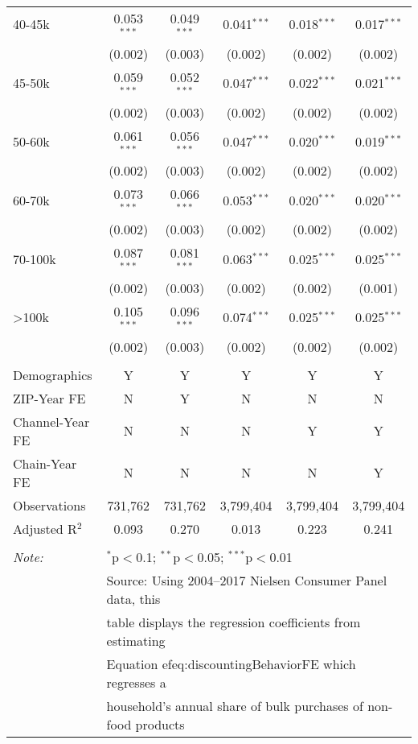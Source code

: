 \begin{table}[!htbp]
\begin{tabular}{@{\extracolsep{5pt}}lccccc}
  40-45k & 0.053$^{***}$ & 0.049$^{***}$ & 0.041$^{***}$ & 0.018$^{***}$ & 0.017$^{***}$ \\ 
  & (0.002) & (0.003) & (0.002) & (0.002) & (0.002) \\ 
  45-50k & 0.059$^{***}$ & 0.052$^{***}$ & 0.047$^{***}$ & 0.022$^{***}$ & 0.021$^{***}$ \\ 
  & (0.002) & (0.003) & (0.002) & (0.002) & (0.002) \\ 
  50-60k & 0.061$^{***}$ & 0.056$^{***}$ & 0.047$^{***}$ & 0.020$^{***}$ & 0.019$^{***}$ \\ 
  & (0.002) & (0.003) & (0.002) & (0.002) & (0.002) \\ 
  60-70k & 0.073$^{***}$ & 0.066$^{***}$ & 0.053$^{***}$ & 0.020$^{***}$ & 0.020$^{***}$ \\ 
  & (0.002) & (0.003) & (0.002) & (0.002) & (0.002) \\ 
  70-100k & 0.087$^{***}$ & 0.081$^{***}$ & 0.063$^{***}$ & 0.025$^{***}$ & 0.025$^{***}$ \\ 
  & (0.002) & (0.003) & (0.002) & (0.002) & (0.001) \\ 
  >100k & 0.105$^{***}$ & 0.096$^{***}$ & 0.074$^{***}$ & 0.025$^{***}$ & 0.025$^{***}$ \\ 
  & (0.002) & (0.003) & (0.002) & (0.002) & (0.002) \\ 
 \hline \\[-1.8ex] 
Demographics & Y & Y & Y & Y & Y \\ 
ZIP-Year FE & N & Y & N & N & N \\ 
Channel-Year FE & N & N & N & Y & Y \\ 
Chain-Year FE & N & N & N & N & Y \\ 
Observations & 731,762 & 731,762 & 3,799,404 & 3,799,404 & 3,799,404 \\ 
Adjusted R$^{2}$ & 0.093 & 0.270 & 0.013 & 0.223 & 0.241 \\ 
\hline 
\hline \\[-1.8ex] 
\textit{Note:}  & \multicolumn{5}{l}{$^{*}$p$<$0.1; $^{**}$p$<$0.05; $^{***}$p$<$0.01} \\ 
 & \multicolumn{5}{l}{Source: Using 2004--2017 Nielsen Consumer Panel data, this } \\ 
 & \multicolumn{5}{l}{table displays the regression coefficients from estimating } \\ 
 & \multicolumn{5}{l}{Equation 
ef{eq:discountingBehaviorFE} which regresses a } \\ 
 & \multicolumn{5}{l}{household's annual share of bulk purchases of non-food products } \\ 

\end{tabular}
\end{table}
